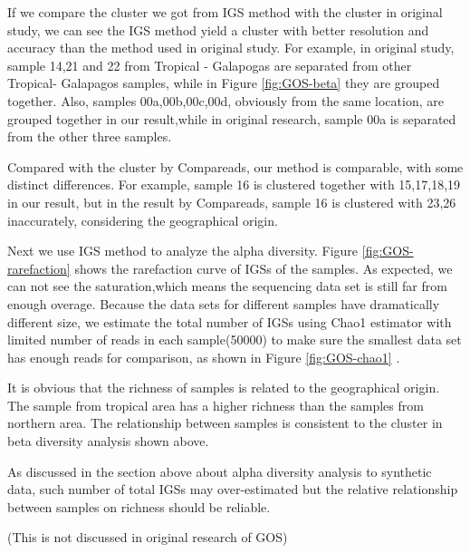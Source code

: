 \documentclass[12pt]{report}
\begin{document}
If we compare the cluster we got from IGS method with the cluster in original study, we can see the IGS method yield a
cluster with better resolution and accuracy than the method used in original study. For example, in original study,
sample 14,21 and 22 from Tropical - Galapogas are separated from other Tropical- Galapagos samples, while in Figure \ref{fig:GOS-beta} 
they are grouped together. Also, samples 00a,00b,00c,00d, obviously from the same location, are grouped together in our result,while
in original research, sample 00a is separated from the other three samples.

Compared with the cluster by Compareads, our method is comparable, with some distinct differences. For example, sample 16 is clustered together with 15,17,18,19 in our result, but in the result by Compareads, sample 16 is clustered with 23,26 inaccurately, considering the geographical origin.

Next we use IGS method to analyze the alpha diversity. Figure \ref{fig:GOS-rarefaction} shows the rarefaction curve of IGSs of the samples.
As expected, we can not see the saturation,which means the sequencing data set is still far from enough overage. 
Because the data sets for different samples have dramatically different size, we estimate the total number of IGSs using Chao1 estimator with limited 
number of reads in each sample(50000) to make sure the smallest data set has enough reads for comparison, as shown in Figure \ref{fig:GOS-chao1} .

It is obvious that the richness of samples is related to the geographical origin. The sample from tropical area has a higher richness than
the samples from northern area. The relationship between samples is consistent to the cluster in beta diversity analysis shown above.

As discussed in the section above about alpha diversity analysis to synthetic data, such number of total IGSs may over-estimated but
the relative relationship between samples on richness should be reliable.

(This is not discussed in original research of GOS)
\end{document}
